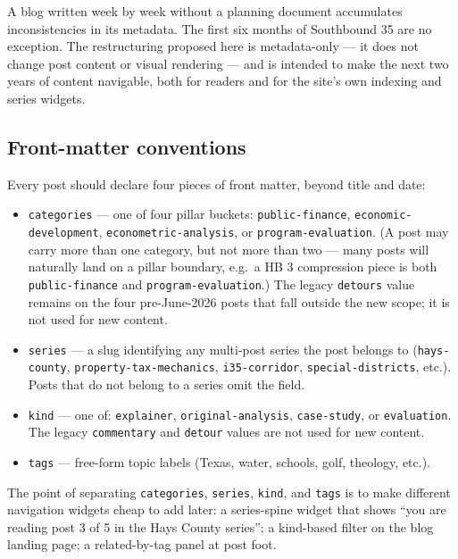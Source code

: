 \documentclass[11pt]{article}
\begin{document}
A blog written week by week without a planning document
accumulates inconsistencies in its metadata. The first six months
of Southbound 35 are no exception. The restructuring proposed
here is metadata-only --- it does not change post content or
visual rendering --- and is intended to make the next two years
of content navigable, both for readers and for the site's own
indexing and series widgets.

\subsection{Front-matter conventions}

Every post should declare four pieces of front matter, beyond
title and date:

\begin{itemize}
\item \texttt{categories} --- one of four pillar buckets:
\texttt{public-finance}, \texttt{economic-development},
\texttt{econometric-analysis}, or \texttt{program-evaluation}.
(A post may carry more than one category, but not more than two
--- many posts will naturally land on a pillar boundary,
e.g.\ a HB 3 compression piece is both
\texttt{public-finance} and \texttt{program-evaluation}.) The
legacy \texttt{detours} value remains on the four pre-June-2026
posts that fall outside the new scope; it is not used for new
content.

\item \texttt{series} --- a slug identifying any multi-post series
the post belongs to (\texttt{hays-county},
\texttt{property-tax-mechanics}, \texttt{i35-corridor},
\texttt{special-districts}, etc.).
Posts that do not belong to a series omit the field.

\item \texttt{kind} --- one of: \texttt{explainer},
\texttt{original-analysis}, \texttt{case-study}, or
\texttt{evaluation}. The legacy \texttt{commentary} and
\texttt{detour} values are not used for new content.

\item \texttt{tags} --- free-form topic labels (Texas, water,
schools, golf, theology, etc.).
\end{itemize}

The point of separating \texttt{categories}, \texttt{series},
\texttt{kind}, and \texttt{tags} is to make different navigation
widgets cheap to add later: a series-spine widget that shows
``you are reading post 3 of 5 in the Hays County series'';
a kind-based filter on the blog landing page; a
related-by-tag panel at post foot.
\end{document}
